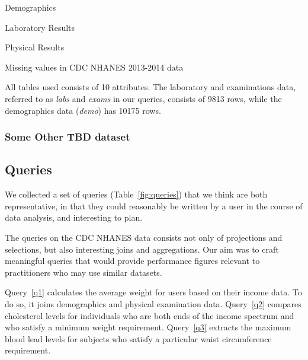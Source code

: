 \begin{table}
    \centering
    \begin{subtable}{0.5\textwidth}
        \centering
       
        \caption{Demographics}
    \end{subtable}
    \begin{subtable}{0.5\textwidth}
        \centering
        
        \caption{Laboratory Results}
    \end{subtable}
       \begin{subtable}{0.5\textwidth}
        \centering
        
        \caption{Physical Results}
    \end{subtable}
    \caption{Missing values in CDC NHANES 2013-2014 data}
\end{table}

All tables used consists of 10 attributes. The laboratory and examinations data,
referred to as \textit{labs} and \textit{exams} in our queries, consists of 9813 rows,
while the demographics data (\textit{demo}) has 10175 rows.

\subsubsection{Some Other TBD dataset}

\subsection{Queries}
We collected a set of queries (Table~\ref{fig:queries}) that we think are both representative, in that they could reasonably be written by a user in the course of data analysis, and interesting to plan.

The queries on the CDC NHANES data consists not only of projections and selections,
but also interesting joins and aggregations. Our aim was to craft meaningful queries
that would provide performance figures relevant to practitioners who may use
similar datasets.

Query~\ref{q1} calculates the average weight for users based on their income data.
To do so, it joins demographics and physical examination data. Query~\ref{q2}
compares cholesterol levels for individuals who are both ends of the income
spectrum and who satisfy a minimum weight requirement. Query~\ref{q3}
extracts the maximum blood lead levels for subjects who satisfy a particular
waist circumference requirement.

